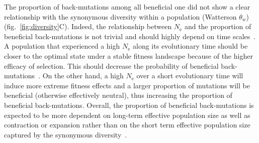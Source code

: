 \documentclass{article}
\newcommand{\Ne}{N_{\textrm{e}}}
\begin{document}
    The proportion of back-mutations among all beneficial one did not show a clear relationship with the synonymous diversity within a population (Watterson $\theta_w$) (fig.~\ref{fig:diversity}C).
    Indeed, the relationship between $\Ne$ and the proportion of beneficial back-mutations is not trivial and should highly depend on time scales~\cite{charlesworth_other_2007}.
    A population that experienced a high $\Ne$ along its evolutionary time should be closer to the optimal state under a stable fitness landscape because of the higher efficacy of selection.
    This should decrease the probability of beneficial back-mutations~\cite{huber_determining_2017}.
    On the other hand, a high $\Ne$ over a short evolutionary time will induce more extreme fitness effects and a larger proportion of mutations will be beneficial (otherwise effectively neutral), thus increasing the proportion of beneficial back-mutations.
    Overall, the proportion of beneficial back-mutations is expected to be more dependent on long-term effective population size as well as contraction or expansion rather than on the short term effective population size captured by the synonymous diversity~\cite{charlesworth_other_2007,huber_determining_2017}.
\end{document}
